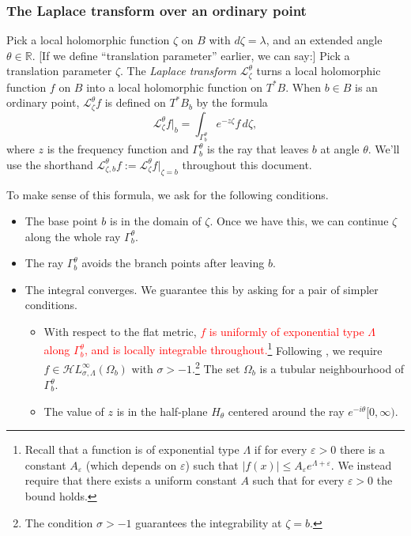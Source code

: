 \documentclass{article}
\newcommand{\singexp}[2]{\mathcal{H}L^\infty_{#1, #2}}
\theoremstyle{definition}
\newcommand{\R}{\mathbb{R}}
\newcommand{\laplace}{\mathcal{L}}
\begin{document}
\subsubsection{The Laplace transform over an ordinary point}\label{laplace:ordinary}
Pick a local holomorphic function $\zeta$ on $B$ with $d\zeta = \lambda$, and an extended angle $\theta \in \R$. \textcolor{VioletRed}{[If we define ``translation parameter'' earlier, we can say:] Pick a translation parameter $\zeta$.} The {\em Laplace transform} $\laplace_\zeta^\theta$ turns a local holomorphic function $f$ on $B$ into a local holomorphic function on $T^*B$. When $b \in B$ is an ordinary point, $\laplace_\zeta^\theta f$ is defined on $T^*B_b$ by the formula
\begin{equation}\label{laplace:int}
\laplace_\zeta^\theta f\big|_b = \int_{\Gamma_b^\theta} e^{-z\zeta} f\,d\zeta,
\end{equation}
where $z$ is the frequency function and $\Gamma_b^\theta$ is the ray that leaves $b$ at angle $\theta$. We’ll use the shorthand $\laplace_{\zeta, b}^\theta f := \laplace_\zeta^\theta f \big|_{\zeta = b}$ throughout this document.

To make sense of this formula, we ask for the following conditions.
\begin{itemize}
\item The base point $b$ is in the domain of $\zeta$. Once we have this, we can continue $\zeta$ along the whole ray $\Gamma_b^\theta$.
\item The ray $\Gamma_b^\theta$ avoids the branch points after leaving $b$.
\item The integral converges. We guarantee this by asking for a pair of simpler conditions.
\begin{itemize}
\item With respect to the flat metric, \textcolor{red}{$f$ is uniformly of exponential type $\Lambda$ along $\Gamma_b^\theta$, and is locally integrable throughout.}\footnote{Recall that a function is of exponential type $\Lambda$ if for every $\varepsilon>0$ there is a constant $A_\varepsilon$ (which depends on $\varepsilon$) such that $|f(x)|\leq A_\varepsilon e^{\Lambda+\varepsilon} $. We instead require that there exists a uniform constant $A$ such that for every $\varepsilon>0$ the bound holds.} Following \cite{reg-sing-volterra}, we require $f\in\singexp{\sigma}{\Lambda}(\Omega_b)$ with $\sigma>-1$.\footnote{The condition $\sigma>-1$ guarantees the integrability at $\zeta=b$.} The set $\Omega_b$ is a tubular neighbourhood of $\Gamma_b^\theta$. 
\item The value of $z$ is in the half-plane $H_{\theta}$ centered around the ray $e^{-i\theta} [0, \infty)$.
\end{itemize}
\end{itemize}
\color{black}
\end{document}
